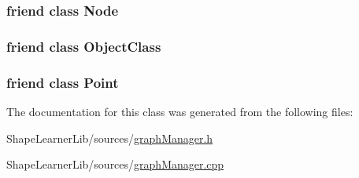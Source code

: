 \subsubsection[{Node}]{\setlength{\rightskip}{0pt plus 5cm}friend class {\bf Node}\hspace{0.3cm}{\ttfamily [friend]}}\label{class_graph_manager_1_1_common_interface_a6db9d28bd448a131448276ee03de1e6d}
\hypertarget{class_graph_manager_1_1_common_interface_a71783b1b8d79e697d7f7fe26cb90774d}{}
\subsubsection[{Object\+Class}]{\setlength{\rightskip}{0pt plus 5cm}friend class {\bf Object\+Class}\hspace{0.3cm}{\ttfamily [friend]}}\label{class_graph_manager_1_1_common_interface_a71783b1b8d79e697d7f7fe26cb90774d}
\hypertarget{class_graph_manager_1_1_common_interface_aa238d52f825b8ea8da6a5c4ae1b8d482}{}
\subsubsection[{Point}]{\setlength{\rightskip}{0pt plus 5cm}friend class {\bf Point}\hspace{0.3cm}{\ttfamily [friend]}}\label{class_graph_manager_1_1_common_interface_aa238d52f825b8ea8da6a5c4ae1b8d482}


The documentation for this class was generated from the following files\+:\begin{DoxyCompactItemize}
\item 
Shape\+Learner\+Lib/sources/\hyperlink{graph_manager_8h}{graph\+Manager.\+h}\item 
Shape\+Learner\+Lib/sources/\hyperlink{graph_manager_8cpp}{graph\+Manager.\+cpp}\end{DoxyCompactItemize}

